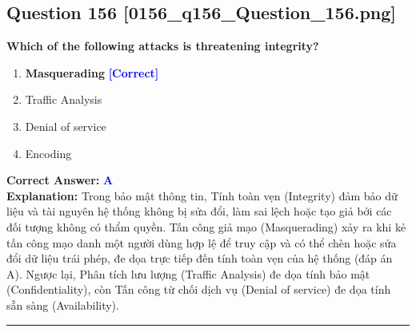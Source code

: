 \documentclass[11pt,a4paper]{article}
\begin{document}
\begin{minipage}{\textwidth}
\subsection*{Question 156 \quad \footnotesize{[0156\_q156\_Question\_156.png]}}
\noindent \textbf{Which of the following attacks is threatening integrity?}

\begin{enumerate}[label=\Alph*.]
    \item \textbf{Masquerading} \hfill \textcolor{blue}{\textbf{[Correct]}}
    \item Traffic Analysis
    \item Denial of service
    \item Encoding
\end{enumerate}

\noindent \textbf{Correct Answer:} \textcolor{blue}{\textbf{A}} \\[2pt]
\noindent \textbf{Explanation:} Trong bảo mật thông tin, Tính toàn vẹn (Integrity) đảm bảo dữ liệu và tài nguyên hệ thống không bị sửa đổi, làm sai lệch hoặc tạo giả bởi các đối tượng không có thẩm quyền. Tấn công giả mạo (Masquerading) xảy ra khi kẻ tấn công mạo danh một người dùng hợp lệ để truy cập và có thể chèn hoặc sửa đổi dữ liệu trái phép, đe dọa trực tiếp đến tính toàn vẹn của hệ thống (đáp án A). Ngược lại, Phân tích lưu lượng (Traffic Analysis) đe dọa tính bảo mật (Confidentiality), còn Tấn công từ chối dịch vụ (Denial of service) đe dọa tính sẵn sàng (Availability).

\par\vspace{0.3cm}
\hrule
\vspace{0.3cm}
\end{minipage}
\end{document}
